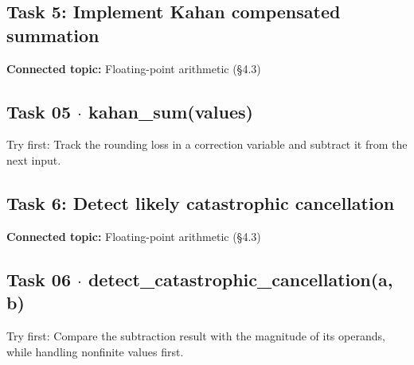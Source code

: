 \documentclass[11pt]{article}
\begin{document}
\begin{keepsection}
\section{Task 5: Implement Kahan compensated summation}

\textbf{Connected topic:} Floating-point arithmetic (§4.3)

\begin{keepsection}
\subsection{Task 05 \ensuremath{\cdot} kahan\_sum(values)}

Try first: Track the rounding loss in a correction variable and subtract it from the next input.

\end{keepsection}
\end{keepsection}

\begin{keepsection}
\section{Task 6: Detect likely catastrophic cancellation}

\textbf{Connected topic:} Floating-point arithmetic (§4.3)

\begin{keepsection}
\subsection{Task 06 \ensuremath{\cdot} detect\_catastrophic\_cancellation(a, b)}

Try first: Compare the subtraction result with the magnitude of its operands, while handling nonfinite values first.

\end{keepsection}
\end{keepsection}
\end{document}
